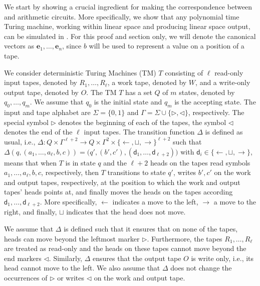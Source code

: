 We start by showing a crucial ingredient for making the correspondence between \langfor
and arithmetic circuits. More specifically, 
we show that any polynomial time Turing machine, working within linear space and producing linear space output, can be simulated in \langfor. 
For this proof and section only, we will denote the canonical vectors as
$\mathbf{e}_1, \ldots, \mathbf{e}_n$, since $b$ will be used to represent a value on a position of a tape.

We consider  deterministic Turing Machines (TM) $T$ consisting of $\ell$ read-only input tapes, 
denoted by $R_1,\ldots,R_\ell$,
a work tape, denoted by $W$, and a write-only output tape, denoted by $O$. The TM $T$ has a set $Q$ of $m$
states, denoted by $q_0,\ldots,q_m$. We assume that $q_0$ is the initial state and $q_m$ is the accepting state.
The input and tape alphabet are $\Sigma=\{0,1\}$ and $\Gamma=\Sigma\cup\{\rhd,\lhd\}$, respectively. The special 
symbol $\rhd$ denotes the beginning of each of the tapes, the symbol $\lhd$ denotes the end of the $\ell$ input tapes. 
The transition function $\Delta$ is defined as usual, i.e., 
$\Delta:Q\times \Gamma^{\ell+2} \to Q\times \Gamma^{2}\times \{\leftarrow,\sqcup,\rightarrow\}^{\ell+2}$ 
such that $\Delta(q,(a_1,\ldots,a_{\ell},b,c))=\bigl(q',(b',c'),(\mathsf{d}_1,\ldots,\mathsf{d}_{\ell+2})\bigr)$
with $\mathsf{d}_i\in \{\leftarrow,\sqcup,\rightarrow\}$, means that when $T$ is in state $q$ and the $\ell+2$ 
heads on the tapes read symbols $a_1,\ldots,a_{\ell},b,c$, respectively, then $T$ transitions to state $q'$,
writes $b',c'$ on the work and output tapes, respectively, at the position to which the work and output 
tapes' heads points at, and finally moves the heads on the tapes according 
$\mathsf{d}_1,\ldots,\mathsf{d}_{\ell+2}$. More specifically, $\leftarrow$  indicates a move to the left, 
$\rightarrow$ a move to the right, and finally, $\sqcup$ indicates that the head does not move.

We assume that $\Delta$ is defined such that it ensures that on none of the tapes, heads can move beyond 
the leftmost marker $\rhd$. Furthermore, the tapes $R_1,\ldots,R_\ell$ are treated as read-only and the heads 
on these tapes cannot move beyond the end markers $\lhd$. Similarly, $\Delta$ ensures that the output tape $O$ 
is write only, i.e., its head cannot move to the left.  We also assume that $\Delta$ does not change the 
occurrences of $\rhd$ or writes $\lhd$ on the work and output tape.

